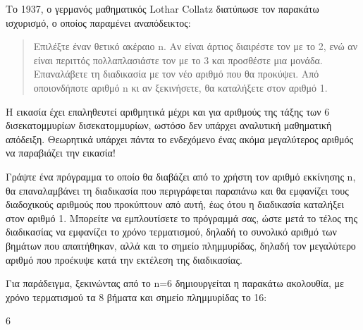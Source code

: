 \documentclass[a4paper,11pt,oneside]{book}
\begin{document}
\begin{exercise} %
Το 1937, ο γερμανός μαθηματικός Lothar Collatz διατύπωσε τον παρακάτω ισχυρισμό, ο οποίος παραμένει αναπόδεικτος:
\begin{quote}
Επιλέξτε έναν θετικό ακέραιο n. Αν είναι άρτιος διαιρέστε τον με το 2, ενώ αν είναι περιττός πολλαπλασιάστε τον με το 3 και προσθέστε μια μονάδα. Επαναλάβετε τη διαδικασία με τον νέο αριθμό που θα προκύψει. Από οποιονδήποτε αριθμό n κι αν ξεκινήσετε, θα καταλήξετε στον αριθμό 1.
\end{quote}
Η εικασία %
έχει επαληθευτεί αριθμητικά μέχρι και για αριθμούς της τάξης των 6 δισεκατομμυρίων δισεκατομμυρίων, ωστόσο δεν υπάρχει αναλυτική μαθηματική απόδειξη. Θεωρητικά υπάρχει πάντα το ενδεχόμενο ένας ακόμα μεγαλύτερος αριθμός να παραβιάζει την εικασία!

Γράψτε ένα πρόγραμμα %
%
το οποίο θα διαβάζει από το χρήστη τον αριθμό εκκίνησης n, θα επαναλαμβάνει τη διαδικασία 
που περιγράφεται παραπάνω και θα εμφανίζει τους διαδοχικούς αριθμούς που προκύπτουν από αυτή, έως ότου η διαδικασία καταλήξει στον αριθμό 1. Μπορείτε να εμπλουτίσετε το πρόγραμμά σας, ώστε μετά το τέλος της διαδικασίας να εμφανίζει το χρόνο τερματισμού, δηλαδή το συνολικό αριθμό των βημάτων που απαιτήθηκαν, αλλά και το σημείο πλημμυρίδας, δηλαδή τον μεγαλύτερο αριθμό που προέκυψε κατά την εκτέλεση της διαδικασίας.

\begin{note}
Για παράδειγμα, ξεκινώντας από το n=6 δημιουργείται η παρακάτω ακολουθία, με χρόνο τερματισμού τα 8 βήματα και σημείο πλημμυρίδας το 16:
\begin{center}
6
\end{center}
\end{note}
\mbox{}\vspace{-24pt}
\end{exercise}
\end{document}
